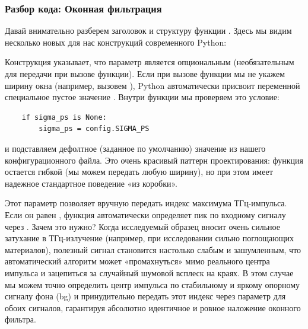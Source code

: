 \subsubsection{Разбор кода: Оконная фильтрация}

Давай внимательно разберем заголовок и структуру функции . Здесь мы видим несколько новых для нас конструкций современного Python:
\begin{syntaxdesc}
    \item[Параметр ширины по умолчанию (строка 7) \mycode{sigma_ps: float = None}] Конструкция  указывает, что параметр  является опциональным (необязательным для передачи при вызове функции). Если при вызове функции мы не укажем ширину окна (например, вызовем ), Python автоматически присвоит переменной  специальное пустое значение . Внутри функции мы проверяем это условие:
    \begin{verbatim}
    if sigma_ps is None:
        sigma_ps = config.SIGMA_PS
    \end{verbatim}
    и подставляем дефолтное (заданное по умолчанию) значение из нашего конфигурационного файла. Это очень красивый паттерн проектирования: функция остается гибкой (мы можем передать любую ширину), но при этом имеет надежное стандартное поведение «из коробки».
    
    \item[Параметр положения пика (строка 7) \mycode{peak_idx: int = None}] Этот параметр позволяет вручную передать индекс максимума ТГц-импульса. Если он равен , функция автоматически определяет пик по входному сигналу  через . Зачем это нужно? Когда исследуемый образец вносит очень сильное затухание в ТГц-излучение (например, при исследовании сильно поглощающих материалов), полезный сигнал становится настолько слабым и зашумленным, что автоматический алгоритм может «промахнуться» мимо реального центра импульса и зацепиться за случайный шумовой всплеск на краях. В этом случае мы можем точно определить центр импульса по стабильному и яркому опорному сигналу фона (bg) и принудительно передать этот индекс через параметр  для обоих сигналов, гарантируя абсолютно идентичное и ровное наложение оконного фильтра.
    

\end{syntaxdesc}
